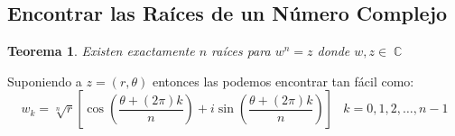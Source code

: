 \documentclass[12pt, fleqn]{report}                             %
\DeclareMathOperator \Space {\quad}                             %
\DeclareMathOperator \MiniSpace {\;}                            %
\newtheorem{Theorem}{Teorema}[section]                          %
\newcommand{\Brackets}[1]{\left[ #1 \right]}                    %
\newcommand{\Wrap}[1]{\left( #1 \right)}                        %
\DeclareMathOperator \Complexs  {\mathbb{C}}                     %
\newcommand{\Cos}[1]{\cos\Wrap{#1}}                             %
\newcommand{\Sin}[1]{\sin\Wrap{#1}}                             %
\newcommand \Cis[1]  {\Cos{#1} + i \Sin{#1}}                    %
\newcommand \bCis[1] {\Brackets{\Cis{#1}}}                      %
\begin{document}
            \subsection{Encontrar las Raíces de un Número Complejo}

                \begin{Theorem}
                    {Existen exactamente $n$ raíces para $w^n = z$ donde $w, z \in \Complexs$}
                \end{Theorem}

                    Suponiendo a $z = (r, \theta)$ entonces las podemos encontrar tan fácil como:
                    \begin{equation}
                        w_k = \sqrt[n]{r} \bCis{\dfrac{\theta + (2\pi) k}{n}}
                        \MiniSpace k = 0, 1, 2, \dots, n-1
                    \end{equation}
\end{document}
